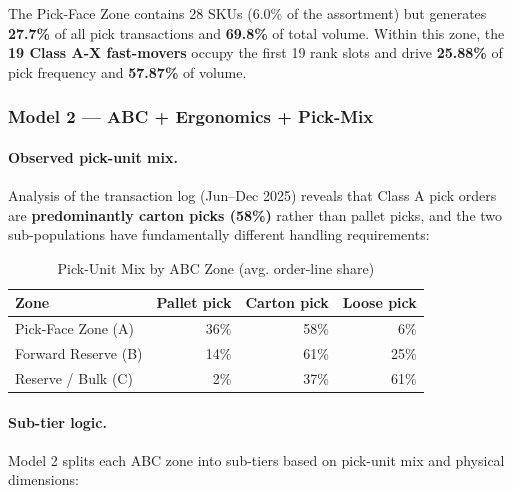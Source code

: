 \documentclass[11pt]{article}
\begin{document}
The Pick-Face Zone contains 28 SKUs (6.0\% of the assortment) but generates
\textbf{27.7\%} of all pick transactions and
\textbf{69.8\%} of total volume.
Within this zone, the \textbf{19 Class A-X fast-movers} occupy the first 19 rank slots
and drive \textbf{25.88\%} of pick frequency and \textbf{57.87\%} of volume.

\subsubsection{Model 2 --- ABC + Ergonomics + Pick-Mix}\label{model2}

\paragraph{Observed pick-unit mix.}
Analysis of the transaction log (Jun--Dec 2025) reveals that Class A pick orders are
\textbf{predominantly carton picks (58\%)} rather than pallet picks, and the two sub-populations
have fundamentally different handling requirements:

\begin{table}[H]
\centering
\caption{Pick-Unit Mix by ABC Zone (avg. order-line share)}
\begin{tabular}{lrrr}
\toprule
Zone & Pallet pick & Carton pick & Loose pick \\
\midrule
        Pick-Face Zone (A) & 36\% & 58\% & 6\% \\
        Forward Reserve (B) & 14\% & 61\% & 25\% \\
        Reserve / Bulk (C) & 2\% & 37\% & 61\% \\
\bottomrule
\end{tabular}
\end{table}

\paragraph{Sub-tier logic.}
Model 2 splits each ABC zone into sub-tiers based on pick-unit mix and physical dimensions:
\end{document}
